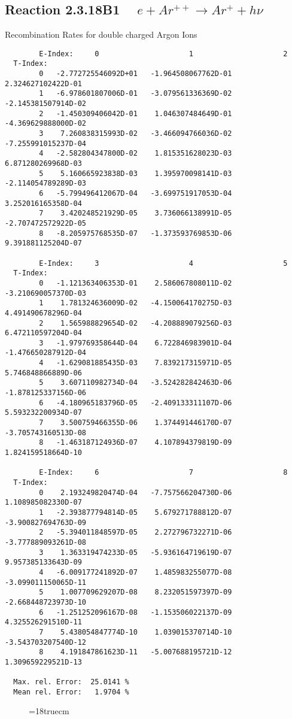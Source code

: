 \subsection{
Reaction 2.3.18B1   $\quad e + Ar^{++} \rightarrow  Ar^+ + h\nu$
}

  Recombination Rates for double
  charged Argon Ions

\begin{verbatim}
        E-Index:     0                     1                     2
  T-Index:
        0   -2.772725546092D+01   -1.964508067762D-01    2.324627102422D-01
        1   -6.978601807006D-01   -3.079561336369D-02   -2.145381507914D-02
        2   -1.450309406042D-01    1.046307484649D-01   -4.369629888000D-02
        3    7.260838315993D-02   -3.466094766036D-02   -7.255991015237D-04
        4   -2.582804347800D-02    1.815351628023D-03    6.871280269968D-03
        5    5.160665923838D-03    1.395970098141D-03   -2.114054789289D-03
        6   -5.799496412067D-04   -3.699751917053D-04    3.252016165358D-04
        7    3.420248521929D-05    3.736066138991D-05   -2.707472572922D-05
        8   -8.205975768535D-07   -1.373593769853D-06    9.391881125204D-07

        E-Index:     3                     4                     5
  T-Index:
        0   -1.121363406353D-01    2.586067808011D-02   -3.210690057370D-03
        1    1.781324636009D-02   -4.150064170275D-03    4.491490678296D-04
        2    1.565988829654D-02   -4.208889079256D-03    6.472110597204D-04
        3   -1.979769358644D-04    6.722846983901D-04   -1.476650287912D-04
        4   -1.629081885435D-03    7.839217315971D-05    5.746848866889D-06
        5    3.607110982734D-04   -3.524282842463D-06   -1.878125337156D-06
        6   -4.180965183796D-05   -2.409133311107D-06    5.593232200934D-07
        7    3.500759466355D-06    1.374491446170D-07   -3.705743160513D-08
        8   -1.463187124936D-07    4.107894379819D-09    1.824159518664D-10

        E-Index:     6                     7                     8
  T-Index:
        0    2.193249820474D-04   -7.757566204730D-06    1.108985082330D-07
        1   -2.393877794814D-05    5.679271788812D-07   -3.900827694763D-09
        2   -5.394011848597D-05    2.272796732271D-06   -3.777889093261D-08
        3    1.363319474233D-05   -5.936164719619D-07    9.957385133643D-09
        4   -6.009177241892D-07    1.485983255077D-08   -3.099011150065D-11
        5    1.007709629207D-08    8.232051597397D-09   -2.668448723973D-10
        6   -1.251252096167D-08   -1.153506022137D-09    4.325526291510D-11
        7    5.438054847774D-10    1.039015370714D-10   -3.543703207540D-12
        8    4.191847861623D-11   -5.007688195721D-12    1.309659229521D-13

  Max. rel. Error:  25.0141 %
  Mean rel. Error:   1.9704 %

\end{verbatim}
\begin{figure} \label{2.3.18B1}
\epsfxsize=18truecm
\end{figure}
\newpage

